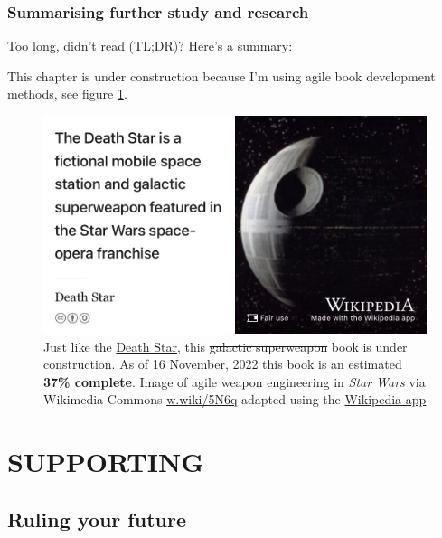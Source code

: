 \documentclass[
]{book}
\begin{document}
\hypertarget{tldr12}{%
\section{Summarising further study and research}\label{tldr12}}

Too long, didn't read (\href{https://en.wiktionary.org/wiki/too_long;_didn\%27t_read}{TL;DR})? Here's a summary:

This chapter is under construction because I'm using agile book development methods, see figure \ref{fig:deathstar9-fig}.

\begin{figure}

{\centering \includegraphics[width=0.99\linewidth]{images/DeathStar2} 

}

\caption{Just like the \href{https://en.wikipedia.org/wiki/Death_Star}{Death Star}, this \sout{galactic superweapon} book is under construction. As of 16 November, 2022 this book is an estimated \textbf{37\% complete}. Image of agile weapon engineering in \emph{Star Wars} via Wikimedia Commons \href{https://w.wiki/5N6q}{w.wiki/5N6q} adapted using the \href{https://apps.apple.com/gb/app/wikipedia/id324715238}{Wikipedia app}}\label{fig:deathstar9-fig}
\end{figure}

\hypertarget{part-supporting}{%
\part{SUPPORTING}\label{part-supporting}}

\hypertarget{ruling}{%
\chapter{Ruling your future}\label{ruling}}
\end{document}
